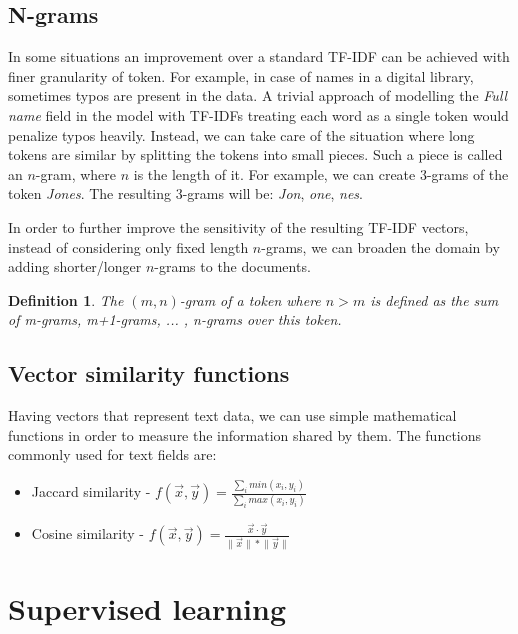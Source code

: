 \documentclass{pracamgr}
\newtheorem{mydef}{Definition}
\begin{document}
\subsection{N-grams}

In some situations an improvement over a standard TF-IDF can be achieved with finer
granularity of token. For example, in case of names in a digital library, sometimes
typos are present in the data. A trivial approach of modelling the \textit{Full name}
field in the model with TF-IDFs treating each word as a single token would penalize
typos heavily. Instead, we can take care of the situation where long tokens are similar
by splitting the tokens into small pieces. Such a piece is called an $n$-gram, where $n$ is
the length of it. For example, we can create $3$-grams of the token \textit{Jones}. The resulting
$3$-grams will be: \textit{Jon}, \textit{one}, \textit{nes}.

In order to further improve the sensitivity of the resulting TF-IDF vectors, instead of
considering only fixed length $n$-grams, we can broaden the domain by adding shorter/longer
$n$-grams to the documents.

\begin{mydef}
The $(m,n)$-gram of a token where $n > m$ is defined as the sum of m-grams, m+1-grams, ... , n-grams
over this token.
\end{mydef}

\subsection{Vector similarity functions}

Having vectors that represent text data, we can use simple mathematical functions in order
to measure the information shared by them. The functions commonly used for text fields
are:

\begin{itemize}

\item Jaccard similarity \citep{Jaccard} - $f(\vec{x},\vec{y}) = \frac{\sum_{i}{min(x_{i}, y_{i})}}{\sum_{i}{max(x_{i}, y_{i})}}$

\item Cosine similarity - $f(\vec{x},\vec{y}) = \frac{\vec{x} \cdot \vec{y}}{\lVert \vec{x} \rVert * \lVert \vec{y} \rVert}$

\end{itemize}



\section{Supervised learning}
\end{document}
